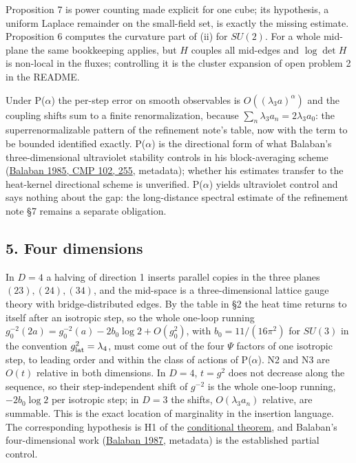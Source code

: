 \documentclass[11pt,a4paper]{article}
\begin{document}
Proposition 7 is power counting made explicit for one cube; its
hypothesis, a uniform Laplace remainder on the small-field set, is
exactly the missing estimate. Proposition 6 computes the curvature part
of (ii) for \(SU(2)\). For a whole mid-plane the same bookkeeping
applies, but \(H\) couples all mid-edges and \(\log\det H\) is non-local
in the fluxes; controlling it is the cluster expansion of open problem 2
in the README.

Under P(\(\alpha\)) the per-step error on smooth observables is
\(O((\lambda_3a)^\alpha)\) and the coupling shifts sum to a finite
renormalization, because \(\sum_n\lambda_3a_n=2\lambda_3a_0\): the
superrenormalizable pattern of the refinement note's table, now with the
term to be bounded identified exactly. P(\(\alpha\)) is the directional
form of what Balaban's three-dimensional ultraviolet stability controls
in his block-averaging scheme
(\href{https://doi.org/10.1007/BF01229380}{Balaban 1985, CMP 102, 255},
metadata); whether his estimates transfer to the heat-kernel directional
scheme is unverified. P(\(\alpha\)) yields ultraviolet control and says
nothing about the gap: the long-distance spectral estimate of the
refinement note §7 remains a separate obligation.

\hypertarget{four-dimensions}{%
\subsection{5. Four dimensions}\label{four-dimensions}}

In \(D=4\) a halving of direction 1 inserts parallel copies in the three
planes \((23),(24),(34)\), and the mid-space is a three-dimensional
lattice gauge theory with bridge-distributed edges. By the table in §2
the heat time returns to itself after an isotropic step, so the whole
one-loop running \(g_0^{-2}(2a)=g_0^{-2}(a)-2b_0\log2+O(g_0^2)\), with
\(b_0=11/(16\pi^2)\) for \(SU(3)\) in the convention
\(g_{\rm lat}^2=\lambda_4\), must come out of the four \(\Psi\) factors
of one isotropic step, to leading order and within the class of actions
of P(\(\alpha\)). N2 and N3 are \(O(t)\) relative in both dimensions. In
\(D=4\), \(t=g^2\) does not decrease along the sequence, so their
step-independent shift of \(g^{-2}\) is the whole one-loop running,
\(-2b_0\log2\) per isotropic step; in \(D=3\) the shifts,
\(O(\lambda_3a_n)\) relative, are summable. This is the exact location
of marginality in the insertion language. The corresponding hypothesis
is H1 of the \href{mass-gap-conditional-theorem.md}{conditional
theorem}, and Balaban's four-dimensional work
(\href{https://doi.org/10.1007/BF01215223}{Balaban 1987}, metadata) is
the established partial control.
\end{document}
